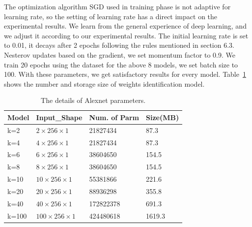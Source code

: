 \documentclass[conference]{IEEEtran}
\begin{document}
The optimization algorithm SGD used in training phase is not adaptive for learning rate, so the setting of learning rate has a direct impact on the experimental results. We learn from the general experience of deep learning, and we adjust it according to our experimental results. The initial learning rate is set to 0.01, it decays after 2 epochs following the rules mentioned in section 6.3.  Nesterov updates based on the gradient, we set momentum factor to 0.9. We train 20 epochs using the dataset for the above 8 models, we set batch size to 100. With these parameters, we get satisfactory results for every model. Table~\ref{tab:params} shows the number and storage size of weights identification model.
\begin{table}
  \caption{The details of Alexnet parameters.}
  \label{tab:params}
  \centering
  \begin{tabular}{p{2cm}p{3cm}p{3cm}p{2cm}}
    \hline
    Model & Input\_Shape &Num. of Parm &Size(MB)\\
    \hline
    k=2      & ${2 \times 256 \times 1}$  & 21827434  &87.3  \\
    k=4      & ${4 \times 256 \times 1}$  & 21827434  &87.3  \\
    k=6      & ${6 \times 256 \times 1}$  & 38604650  &154.5  \\
    k=8      & ${8 \times 256 \times 1}$  & 38604650  &154.5 \\
    k=10     & ${10 \times 256 \times 1}$  & 55381866  &221.6  \\
    k=20     & ${20 \times 256 \times 1}$  & 88936298  &355.8 \\
    k=40     & ${40 \times 256 \times 1}$  & 172822378  &691.3  \\
    k=100    & ${100 \times 256 \times 1}$  & 424480618  &1619.3  \\
    \hline
  \end{tabular}
\end{table}
\end{document}
